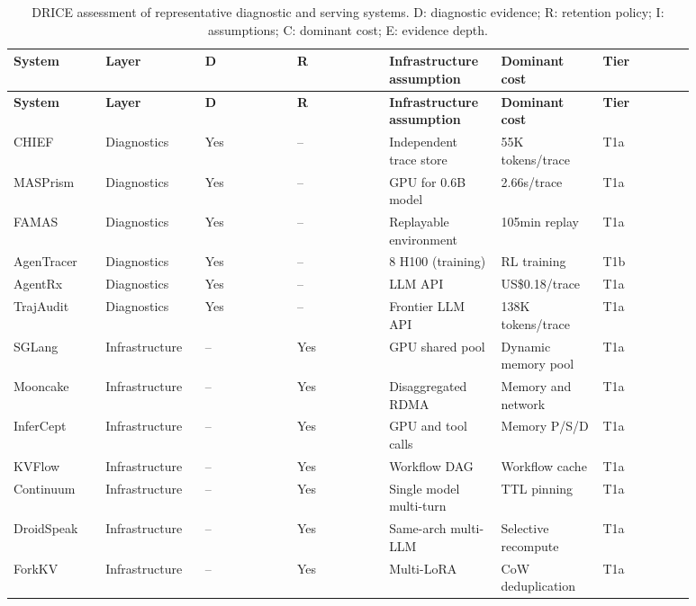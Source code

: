 \documentclass[preprint,12pt]{elsarticle}
\begin{document}
\begin{center}
\begingroup
\setlength{\tabcolsep}{2pt}
\renewcommand{\arraystretch}{1.16}
\scriptsize
\begin{longtable}{|p{0.126\linewidth}|p{0.126\linewidth}|p{0.126\linewidth}|p{0.126\linewidth}|p{0.126\linewidth}|p{0.126\linewidth}|p{0.126\linewidth}|}
\caption{DRICE assessment of representative diagnostic and serving systems. D: diagnostic evidence; R: retention policy; I: assumptions; C: dominant cost; E: evidence depth.}\label{tab:v5_12}\\
\hline
\textbf{System} & \textbf{Layer} & \textbf{D} & \textbf{R} & \textbf{Infrastructure assumption} & \textbf{Dominant cost} & \textbf{Tier} \\ \hline
\endfirsthead
\textbf{System} & \textbf{Layer} & \textbf{D} & \textbf{R} & \textbf{Infrastructure assumption} & \textbf{Dominant cost} & \textbf{Tier} \\ \hline
\endhead
CHIEF & Diagnostics & Yes & -- & Independent trace store & 55K tokens/trace & T1a \\ \hline
MASPrism & Diagnostics & Yes & -- & GPU for 0.6B model & 2.66s/trace & T1a \\ \hline
FAMAS & Diagnostics & Yes & -- & Replayable environment & 105min replay & T1a \\ \hline
AgenTracer & Diagnostics & Yes & -- & 8 H100 (training) & RL training & T1b \\ \hline
AgentRx & Diagnostics & Yes & -- & LLM API & US\$0.18/trace & T1a \\ \hline
TrajAudit & Diagnostics & Yes & -- & Frontier LLM API & 138K tokens/trace & T1a \\ \hline
SGLang & Infrastructure & -- & Yes & GPU shared pool & Dynamic memory pool & T1a \\ \hline
Mooncake & Infrastructure & -- & Yes & Disaggregated RDMA & Memory and network & T1a \\ \hline
InferCept & Infrastructure & -- & Yes & GPU and tool calls & Memory P/S/D & T1a \\ \hline
KVFlow & Infrastructure & -- & Yes & Workflow DAG & Workflow cache & T1a \\ \hline
Continuum & Infrastructure & -- & Yes & Single model multi-turn & TTL pinning & T1a \\ \hline
DroidSpeak & Infrastructure & -- & Yes & Same-arch multi-LLM & Selective recompute & T1a \\ \hline
ForkKV & Infrastructure & -- & Yes & Multi-LoRA & CoW deduplication & T1a \\ \hline

\end{longtable}
\end{center}
\end{document}
